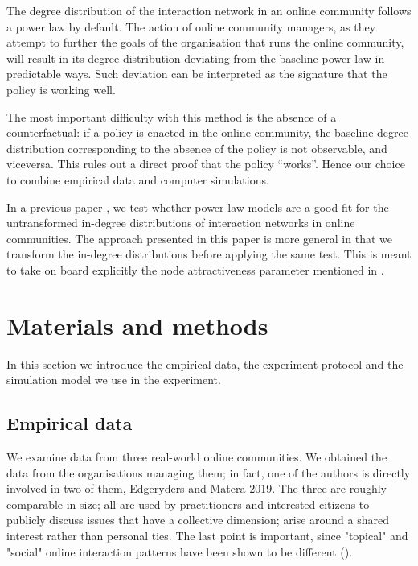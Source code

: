 \documentclass{bmcart}
\begin{document}
The degree distribution of the interaction network in an online community follows a power law by default. The action of online community managers, as they attempt to further the goals of the organisation that runs the online community, will result in its degree distribution deviating from the baseline power law in predictable ways. Such deviation can be interpreted as the signature that the policy is working well. 

The most important difficulty with this method is the absence of a counterfactual: if a policy is enacted in the online community, the baseline degree distribution corresponding to the absence of the policy is not observable, and viceversa. This rules out a direct proof that the policy ``works''. Hence our choice to combine empirical data and computer simulations. 

In a previous paper \cite{cottica2016testing}, we test whether power law models are a good fit for the untransformed in-degree distributions of interaction networks in online communities. The approach presented in this paper is more general in that we transform the in-degree distributions before applying the same test. This is meant to take on board explicitly the node attractiveness parameter mentioned in \cite{dorogovtsev2002evolution}.


\section{Materials and methods}
\label{sec:materials}
In this section we introduce the empirical data, the experiment protocol and the simulation model we use in the experiment. 

\subsection{Empirical data}
\label{sec:empirical_data}

We examine data from three real-world online communities. We obtained the data from the organisations managing them; in fact, one of the authors is directly involved in two of them, Edgeryders and Matera 2019. 
The three are roughly comparable in size; all are used by practitioners and interested citizens to publicly discuss issues that have a collective dimension; arise around a shared interest rather than personal ties. The last point is important, since "topical" and "social" online interaction patterns have been shown to be different (\cite{grabowicz2013distinguishing}).
\end{document}
